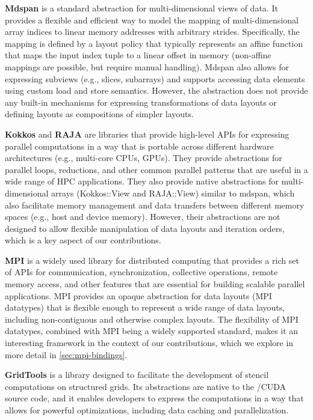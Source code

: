 \textbf{Mdspan} is a \cpp standard abstraction for multi-dimensional views of data. It provides a flexible and efficient way to model the mapping of multi-dimensional array indices to linear memory addresses with arbitrary strides. Specifically, the mapping is defined by a layout policy that typically represents an affine function that maps the input index tuple to a linear offset in memory (non-affine mappings are possible, but require manual handling). Mdspan also allows for expressing subviews (e.g., slices, subarrays) and supports accessing data elements using custom load and store semantics. However, the abstraction does not provide any built-in mechanisms for expressing transformations of data layouts or defining layouts as compositions of simpler layouts.

\textbf{Kokkos} and \textbf{RAJA} are \cpp libraries that provide high-level APIs for expressing parallel computations in a way that is portable across different hardware architectures (e.g., multi-core CPUs, GPUs). They provide abstractions for parallel loops, reductions, and other common parallel patterns that are useful in a wide range of HPC applications. They also provide native abstractions for multi-dimensional arrays (Kokkos::View and RAJA::View) similar to mdspan, which also facilitate memory management and data transfers between different memory spaces (e.g., host and device memory). However, their abstractions are not designed to allow flexible manipulation of data layouts and iteration orders, which is a key aspect of our contributions.

\textbf{MPI} is a widely used library for distributed computing that provides a rich set of APIs for communication, synchronization, collective operations, remote memory access, and other features that are essential for building scalable parallel applications. MPI provides an opaque abstraction for data layouts (MPI datatypes) that is flexible enough to represent a wide range of data layouts, including non-contiguous and otherwise complex layouts. The flexibility of MPI datatypes, combined with MPI being a widely supported standard, makes it an interesting framework in the context of our contributions, which we explore in more detail in \cref{sec:mpi-bindings}.

\textbf{GridTools} is a \cpp library designed to facilitate the development of stencil computations on structured grids. Its abstractions are native to the \cpp/CUDA source code, and it enables developers to express the computations in a way that allows for powerful optimizations, including data caching and parallelization.

